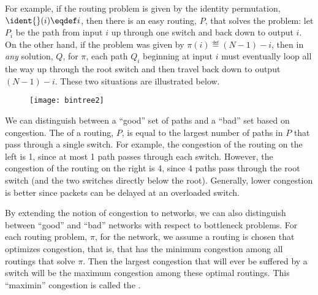 For example, if the routing problem is given by the identity permutation,
$\ident{}(i) \eqdef i$, then there is an easy routing, $P$, that solves
the problem: let $P_i$ be the path from input $i$ up through one switch
and back down to output $i$.  On the other hand, if the problem was given
by $\pi(i) \eqdef (N - 1) - i$, then in \emph{any} solution, $Q$, for
$\pi$, each path $Q_i$ beginning at input $i$ must eventually loop all
the way up through the root switch and then travel back down to output $(N
- 1) - i$.  These two situations are illustrated below.
\begin{figure}
\texttt{[image: bintree2]}
\end{figure}
We can distinguish between a ``good'' set of paths and a ``bad'' set based
on congestion.  The  of a routing, $P$, is equal to the
largest number of paths in $P$ that pass through a single switch.  For
example, the congestion of the routing on the left is 1, since at most 1
path passes through each switch.  However, the congestion of the routing
on the right is 4, since 4 paths pass through the root switch (and the two
switches directly below the root).  Generally, lower congestion is better
since packets can be delayed at an overloaded switch.

By extending the notion of congestion to networks, we can also distinguish
between ``good'' and ``bad'' networks with respect to bottleneck problems.
For each routing problem, $\pi$, for the network, we assume a routing is
chosen that optimizes congestion, that is, that has the minimum congestion
among all routings that solve $\pi$.  Then the largest congestion that
will ever be suffered by a switch will be the maximum congestion among
these optimal routings.  This ``maximin'' congestion is called the
.

